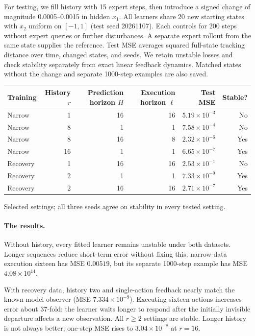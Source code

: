 \documentclass{l4dc2026}
\begin{document}
For testing, we fill history with 15 expert steps, then introduce a signed change of magnitude 0.0005--0.0015 in hidden $x_1$. All learners share 20 new starting states with $x_2$ uniform on $[-1,1]$ (test seed 20261107). Each controls for 200 steps without expert queries or further disturbances. A separate expert rollout from the same state supplies the reference. Test MSE averages squared full-state tracking distance over time, changed states, and seeds. We retain unstable losses and check stability separately from exact linear feedback dynamics. Matched states without the change and separate 1000-step examples are also saved.

\begin{center}\small
\begin{tabular}{lrrrrr}\toprule
Training & History $r$ & Prediction horizon $H$ & Execution horizon $\ell$ & Test MSE & Stable?\\\midrule
Narrow & 1 & 16 & 16 & $5.19\times10^{-3}$ & No\\
Narrow & 8 & 1 & 1 & $7.58\times10^{-4}$ & No\\
Narrow & 8 & 16 & 8 & $2.32\times10^{-6}$ & Yes\\
Narrow & 16 & 1 & 1 & $6.65\times10^{-7}$ & Yes\\
Recovery & 1 & 16 & 16 & $2.53\times10^{-1}$ & No\\
Recovery & 2 & 1 & 1 & $7.33\times10^{-9}$ & Yes\\
Recovery & 2 & 16 & 16 & $2.71\times10^{-7}$ & Yes\\\bottomrule
\end{tabular}
\end{center}
\noindent Selected settings; all three seeds agree on stability in every tested setting.

\paragraph{The results.}
Without history, every fitted learner remains unstable under both datasets. Longer sequences reduce short-term error without fixing this: narrow-data execution sixteen has MSE $0.00519$, but its separate 1000-step example has MSE $4.08\times10^{14}$.

With recovery data, history two and single-action feedback nearly match the known-model observer (MSE $7.334\times10^{-9}$). Executing sixteen actions increases error about 37-fold: the learner waits longer to respond after the initially invisible departure affects a new observation. All $r\ge2$ settings are stable. Longer history is not always better; one-step MSE rises to $3.04\times10^{-8}$ at $r=16$.
\end{document}
